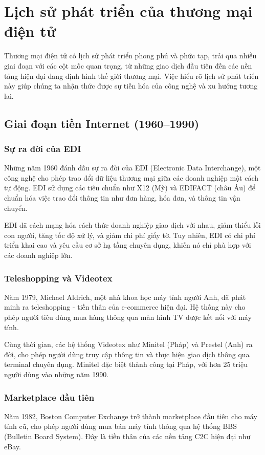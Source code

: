 \documentclass[a4paper,12pt]{report}
\begin{document}
\section{Lịch sử phát triển của thương mại điện tử}

Thương mại điện tử có lịch sử phát triển phong phú và phức tạp, trải qua nhiều giai đoạn với các cột mốc quan trọng, từ những giao dịch đầu tiên đến các nền tảng hiện đại đang định hình thế giới thương mại. Việc hiểu rõ lịch sử phát triển này giúp chúng ta nhận thức được sự tiến hóa của công nghệ và xu hướng tương lai.

\subsection{Giai đoạn tiền Internet (1960--1990)}

\subsubsection{Sự ra đời của EDI}
Những năm 1960 đánh dấu sự ra đời của EDI (Electronic Data Interchange), một công nghệ cho phép trao đổi dữ liệu thương mại giữa các doanh nghiệp một cách tự động. EDI sử dụng các tiêu chuẩn như X12 (Mỹ) và EDIFACT (châu Âu) để chuẩn hóa việc trao đổi thông tin như đơn hàng, hóa đơn, và thông tin vận chuyển.

EDI đã cách mạng hóa cách thức doanh nghiệp giao dịch với nhau, giảm thiểu lỗi con người, tăng tốc độ xử lý, và giảm chi phí giấy tờ. Tuy nhiên, EDI có chi phí triển khai cao và yêu cầu cơ sở hạ tầng chuyên dụng, khiến nó chỉ phù hợp với các doanh nghiệp lớn.

\subsubsection{Teleshopping và Videotex}
Năm 1979, Michael Aldrich, một nhà khoa học máy tính người Anh, đã phát minh ra teleshopping - tiền thân của e-commerce hiện đại. Hệ thống này cho phép người tiêu dùng mua hàng thông qua màn hình TV được kết nối với máy tính.

Cùng thời gian, các hệ thống Videotex như Minitel (Pháp) và Prestel (Anh) ra đời, cho phép người dùng truy cập thông tin và thực hiện giao dịch thông qua terminal chuyên dụng. Minitel đặc biệt thành công tại Pháp, với hơn 25 triệu người dùng vào những năm 1990.

\subsubsection{Marketplace đầu tiên}
Năm 1982, Boston Computer Exchange trở thành marketplace đầu tiên cho máy tính cũ, cho phép người dùng mua bán máy tính thông qua hệ thống BBS (Bulletin Board System). Đây là tiền thân của các nền tảng C2C hiện đại như eBay.
\end{document}
